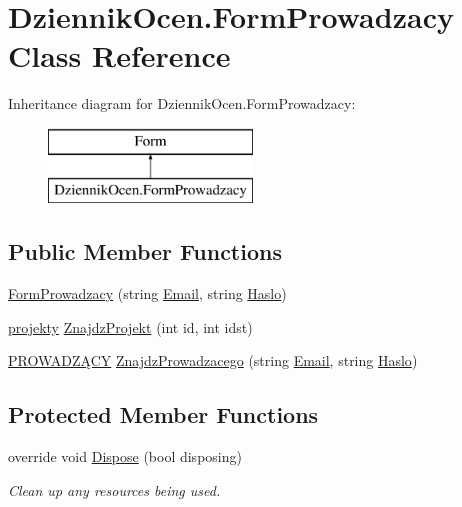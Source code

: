 \hypertarget{class_dziennik_ocen_1_1_form_prowadzacy}{}\section{Dziennik\+Ocen.\+Form\+Prowadzacy Class Reference}
\label{class_dziennik_ocen_1_1_form_prowadzacy}
Inheritance diagram for Dziennik\+Ocen.\+Form\+Prowadzacy\+:\begin{figure}[H]
\begin{center}
\leavevmode
\includegraphics[height=2.000000cm]{class_dziennik_ocen_1_1_form_prowadzacy}
\end{center}
\end{figure}
\subsection*{Public Member Functions}
\begin{DoxyCompactItemize}
\item 
\hyperlink{class_dziennik_ocen_1_1_form_prowadzacy_a3b383a27c47250980feb63495b1e06a6}{Form\+Prowadzacy} (string \hyperlink{class_dziennik_ocen_1_1_form_prowadzacy_a2a8c88aed0e523c43b18ac50002680d4}{Email}, string \hyperlink{class_dziennik_ocen_1_1_form_prowadzacy_a97552a9d67d35422ddc14b94222d100b}{Haslo})
\item 
\hyperlink{class_dziennik_ocen_1_1projekty}{projekty} \hyperlink{class_dziennik_ocen_1_1_form_prowadzacy_ab1f0a40f408e000fc15acafed5910bce}{Znajdz\+Projekt} (int id, int idst)
\item 
\hyperlink{class_dziennik_ocen_1_1_p_r_o_w_a_d_z_xC4_x84_c_y}{P\+R\+O\+W\+A\+D\+ZĄ\+CY} \hyperlink{class_dziennik_ocen_1_1_form_prowadzacy_a1836411433e5b2c6dd8b85e9df9c46d0}{Znajdz\+Prowadzacego} (string \hyperlink{class_dziennik_ocen_1_1_form_prowadzacy_a2a8c88aed0e523c43b18ac50002680d4}{Email}, string \hyperlink{class_dziennik_ocen_1_1_form_prowadzacy_a97552a9d67d35422ddc14b94222d100b}{Haslo})
\end{DoxyCompactItemize}
\subsection*{Protected Member Functions}
\begin{DoxyCompactItemize}
\item 
override void \hyperlink{class_dziennik_ocen_1_1_form_prowadzacy_a33b9f735dca4c248819321d0692c98c5}{Dispose} (bool disposing)
\begin{DoxyCompactList}\small\item\em Clean up any resources being used. \end{DoxyCompactList}\end{DoxyCompactItemize}
